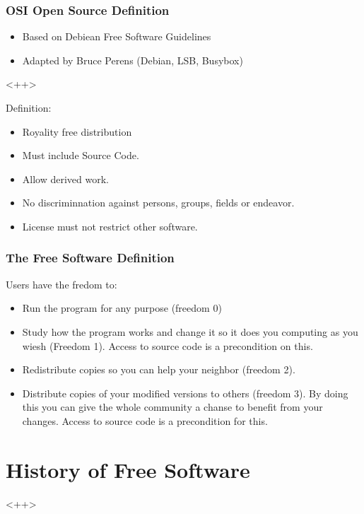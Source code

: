 \documentclass[hyperref={pdfpagelabels=false},xcolor=pst,pdf,fragile]{beamer}
\begin{document}
\begin{frame}
  \frametitle{OSI Open Source Definition}

  \begin{itemize}
	\item Based on Debiean Free Software Guidelines
	\item Adapted by Bruce Perens (Debian, LSB, Busybox)
  \end{itemize}<++>

  Definition:
  \begin{itemize}
	\item Royality free distribution
	\item Must include Source Code.
	\item Allow derived work.
	\item No discriminnation against persons, groups, fields or endeavor.
	\item License must not restrict other software.
  \end{itemize}

\end{frame}

\begin{frame}
  \frametitle{The Free Software Definition}

  Users have the fredom to:

  \begin{itemize}
	\item Run the program for any purpose (freedom 0)
	\item Study how the program works and change it  so it does you
	  computing as you wiesh (Freedom 1). Access to source code is a
	  precondition on this.
	\item Redistribute copies so you can help your neighbor (freedom 2).
	\item Distribute copies of your modified versions to others (freedom
	  3). By doing this you can give the whole community a chanse to
	  benefit from your changes. Access to source code is a precondition
	  for this.
  \end{itemize}

\end{frame}

\section{History of Free Software}<++>
\end{document}
